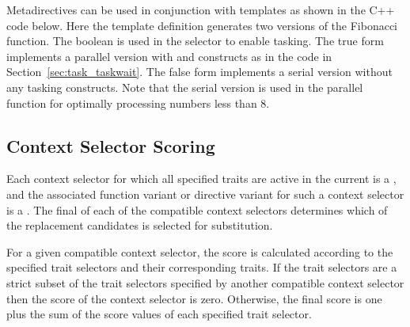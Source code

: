 



Metadirectives can be used in conjunction with templates as shown in the C++ code below.
Here the template definition generates two versions of the Fibonacci function.
The  boolean is used in the  selector to enable tasking.
The true form implements a parallel version with  and 
constructs as in the  code in Section~\ref{sec:task_taskwait}. 
The false form implements a serial version without any tasking constructs.
Note that the serial version is used in the parallel function for optimally
processing numbers less than 8.


\subsection{Context Selector Scoring}

\label{subsec:context_selector_scoring}

Each context selector for which all specified traits are active in the current
 is a , and the associated
function variant or directive variant for such a context selector is a
. The final  of each of the compatible
context selectors determines which of the replacement candidates is selected for
substitution. 

For a given compatible context selector, the score is calculated according
to the specified trait selectors and their corresponding traits. If the trait
selectors are a strict subset of the trait selectors specified by another
compatible context selector then the score of the context selector is zero.
Otherwise, the final score is one plus the sum of the score values of each
specified trait selector.

